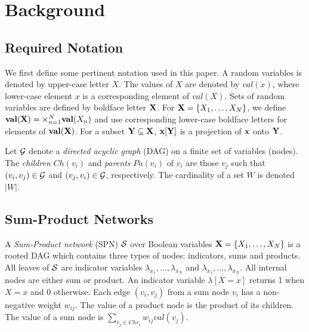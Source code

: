 \section{Background}

\subsection{Required Notation}

We first define some pertinent notation used in this paper.
A random variables is denoted by upper-case letter $X$.
The values of $X$ are denoted by $val(x)$, where lower-case element $x$ is a corresponding element of $val(X)$.
Sets of random variables are defined by boldface letter ${\bf X}$.
For ${\bf X} = \{X_1,\dots,X_N\}$, we define ${\bf val(X)} = \times^{N}_{n=1}{{\bf val}(X_n)}$ and use corresponding lower-case boldface  letters for elements of ${\bf val(X)}$.
For a subset ${\bf Y \subseteq X}$, ${\bf x[Y]}$ is a projection of ${\bf x}$ onto ${\bf Y}$.

Let ${\cal G}$ denote a \emph{directed acyclic graph} (DAG) on a finite set of variables (nodes).
The \emph{children} $Ch(v_i)$ and \emph{parents} $Pa(v_i)$ of $v_i$ are those $v_j$ such that $(v_i,v_j) \in {\cal G}$ and $(v_j,v_i) \in {\cal G}$, respectively.
The cardinality of a set $W$ is denoted $|W|$.


\subsection{Sum-Product Networks}

A \emph{Sum-Product network} (SPN) $\cal S$ over Boolean variables ${\bf X} = \{X_1,\dots,X_N\}$ is a rooted DAG which contains three types of nodes: indicators, sums and products.
All leaves of $\cal S$ are indicator variables $\lambda_{x_1},\ldots,\lambda_{x_N}$ and $\lambda_{\bar{x}_1},\ldots,\lambda_{\bar{x}_N}$.
All internal nodes are either sum or product.
An indicator variable $\lambda[X=x]$ returns 1 when $X=x$ and 0 otherwise.
Each edge $(v_i,v_j)$ from a sum node $v_i$ has a non-negative weight $w_{ij}$.
The value of a product node is the product of its children.
The value of a sum node is $\sum_{v_j \in Ch{v_i}}{w_{ij}val(v_j)}$.

